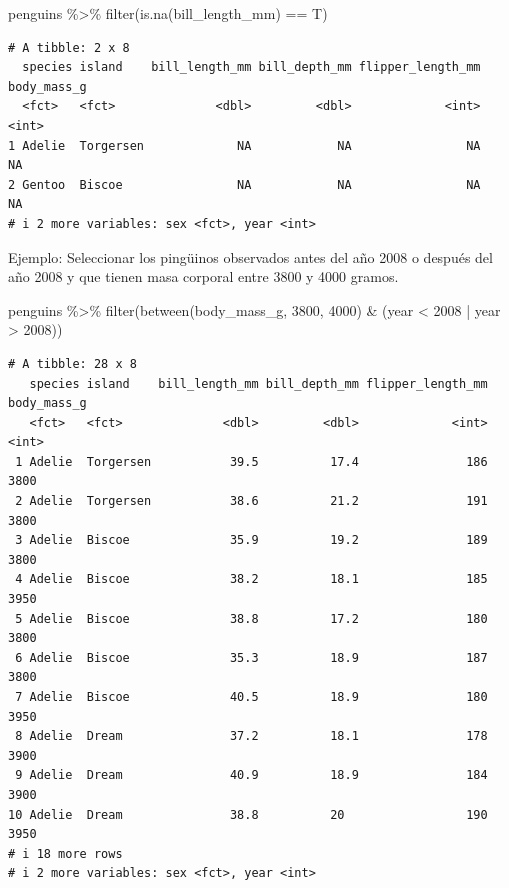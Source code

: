\documentclass[
  letterpaper,
  DIV=11,
  numbers=noendperiod]{scrreprt}
\newenvironment{Shaded}{\begin{snugshade}}{\end{snugshade}}
\newcommand{\DecValTok}[1]{\textcolor[rgb]{0.68,0.00,0.00}{#1}}
\newcommand{\FunctionTok}[1]{\textcolor[rgb]{0.28,0.35,0.67}{#1}}
\newcommand{\NormalTok}[1]{\textcolor[rgb]{0.00,0.23,0.31}{#1}}
\newcommand{\SpecialCharTok}[1]{\textcolor[rgb]{0.37,0.37,0.37}{#1}}
\begin{document}
\begin{Shaded}
\begin{Highlighting}[]
\NormalTok{penguins }\SpecialCharTok{\%\textgreater{}\%} 
  \FunctionTok{filter}\NormalTok{(}\FunctionTok{is.na}\NormalTok{(bill\_length\_mm) }\SpecialCharTok{==}\NormalTok{ T)}
\end{Highlighting}
\end{Shaded}

\begin{verbatim}
# A tibble: 2 x 8
  species island    bill_length_mm bill_depth_mm flipper_length_mm body_mass_g
  <fct>   <fct>              <dbl>         <dbl>             <int>       <int>
1 Adelie  Torgersen             NA            NA                NA          NA
2 Gentoo  Biscoe                NA            NA                NA          NA
# i 2 more variables: sex <fct>, year <int>
\end{verbatim}

{Ejemplo}: Seleccionar los pingüinos observados antes del año 2008 o
después del año 2008 y que tienen masa corporal entre 3800 y 4000
gramos.

\begin{Shaded}
\begin{Highlighting}[]
\NormalTok{penguins }\SpecialCharTok{\%\textgreater{}\%} 
  \FunctionTok{filter}\NormalTok{(}\FunctionTok{between}\NormalTok{(body\_mass\_g, }\DecValTok{3800}\NormalTok{, }\DecValTok{4000}\NormalTok{) }\SpecialCharTok{\&}\NormalTok{ (year }\SpecialCharTok{\textless{}} \DecValTok{2008} \SpecialCharTok{|}\NormalTok{ year }\SpecialCharTok{\textgreater{}} \DecValTok{2008}\NormalTok{))}
\end{Highlighting}
\end{Shaded}

\begin{verbatim}
# A tibble: 28 x 8
   species island    bill_length_mm bill_depth_mm flipper_length_mm body_mass_g
   <fct>   <fct>              <dbl>         <dbl>             <int>       <int>
 1 Adelie  Torgersen           39.5          17.4               186        3800
 2 Adelie  Torgersen           38.6          21.2               191        3800
 3 Adelie  Biscoe              35.9          19.2               189        3800
 4 Adelie  Biscoe              38.2          18.1               185        3950
 5 Adelie  Biscoe              38.8          17.2               180        3800
 6 Adelie  Biscoe              35.3          18.9               187        3800
 7 Adelie  Biscoe              40.5          18.9               180        3950
 8 Adelie  Dream               37.2          18.1               178        3900
 9 Adelie  Dream               40.9          18.9               184        3900
10 Adelie  Dream               38.8          20                 190        3950
# i 18 more rows
# i 2 more variables: sex <fct>, year <int>
\end{verbatim}
\end{document}
